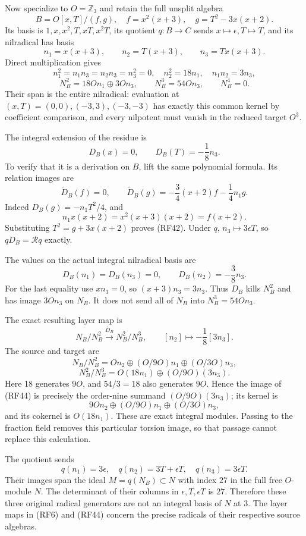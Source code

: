 \documentclass[
]{article}
\begin{document}
Now specialize to \(O=\mathbb Z_3\) and retain the full unsplit algebra
\[
B=O[x,T]/(f,g),\quad
f=x^2(x+3),\quad g=T^2-3x(x+2).
\tag{RF39}
\] Its basis is \(1,x,x^2,T,xT,x^2T\), its quotient \(q:B\to C\) sends
\(x\mapsto\epsilon,T\mapsto T\), and its nilradical has basis \[
n_1=x(x+3),\qquad n_2=T(x+3),\qquad n_3=Tx(x+3).
\] Direct multiplication gives \[
n_1^2=n_1n_3=n_2n_3=n_3^2=0,\quad
n_2^2=18n_1,\quad n_1n_2=3n_3,
\] \[
N_B^2=18On_1\oplus3On_3,\qquad
N_B^3=54On_3,\qquad N_B^4=0.
\tag{RF40}
\] Their span is the entire nilradical: evaluation at
\((x,T)=(0,0),(-3,3),(-3,-3)\) has exactly this common kernel by
coefficient comparison, and every nilpotent must vanish in the reduced
target \(O^3\).

The integral extension of the residue is \[
D_B(x)=0,\qquad D_B(T)=-\frac18n_3.
\tag{RF41}
\] To verify that it is a derivation on \(B\), lift the same polynomial
formula. Its relation images are \[
\widetilde D_B(f)=0,\qquad
\widetilde D_B(g)
=-\frac34(x+2)f-\frac14n_1g.
\tag{RF42}
\] Indeed \(D_B(g)=-n_1T^2/4\), and \[
n_1x(x+2)=x^2(x+3)(x+2)=f(x+2).
\] Substituting \(T^2=g+3x(x+2)\) proves (RF42). Under \(q\),
\(n_3\mapsto3\epsilon T\), so \(qD_B=\mathcal Rq\) exactly.

The values on the actual integral nilradical basis are \[
D_B(n_1)=D_B(n_3)=0,\qquad D_B(n_2)=-\frac38n_3.
\tag{RF43}
\] For the last equality use \(xn_3=0\), so \((x+3)n_3=3n_3\). Thus
\(D_B\) kills \(N_B^2\) and has image \(3On_3\) on \(N_B\). It does not
send all of \(N_B\) into \(N_B^3=54On_3\).

The exact resulting layer map is \[
N_B/N_B^2\xrightarrow{\overline D_B}N_B^2/N_B^3,
\qquad[n_2]\longmapsto-\frac18[3n_3].
\tag{RF44}
\] The source and target are \[
N_B/N_B^2
=On_2\oplus(O/9O)n_1\oplus(O/3O)n_3,
\] \[
N_B^2/N_B^3
=O(18n_1)\oplus(O/9O)(3n_3).
\tag{RF45}
\] Here 18 generates \(9O\), and \(54/3=18\) also generates \(9O\).
Hence the image of (RF44) is precisely the order-nine summand
\((O/9O)(3n_3)\); its kernel is \[
9On_2\oplus(O/9O)n_1\oplus(O/3O)n_3,
\] and its cokernel is \(O(18n_1)\). These are exact integral modules.
Passing to the fraction field removes this particular torsion image, so
that passage cannot replace this calculation.

The quotient sends \[
q(n_1)=3\epsilon,\quad
q(n_2)=3T+\epsilon T,\quad
q(n_3)=3\epsilon T.
\tag{RF46}
\] Their images span the ideal \(M=q(N_B)\subset N\) with index \(27\)
in the full free \(O\)-module \(N\). The determinant of their columns in
\(\epsilon,T,\epsilon T\) is \(27\). Therefore these three original
radical generators are not an integral basis of \(N\) at 3. The layer
maps in (RF6) and (RF44) concern the precise radicals of their
respective source algebras.
\end{document}
